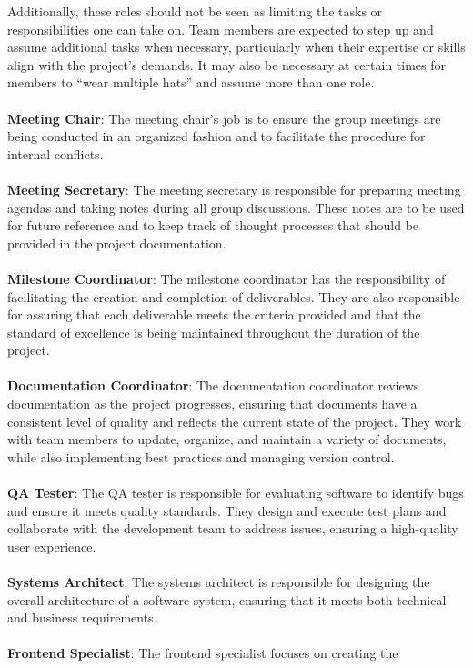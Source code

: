 \documentclass{article}
\begin{document}
Additionally, these roles should not be seen as limiting the tasks or
responsibilities one can take on. Team members are expected to step up and
assume additional tasks when necessary, particularly when their expertise or
skills align with the project’s demands. It may also be necessary at certain
times for members to “wear multiple hats” and assume more than one role. \\
\\
\textbf{Meeting Chair}: The meeting chair’s job is to ensure the group meetings
are being conducted in an organized fashion and to facilitate the procedure for
internal conflicts. \\
\\
\textbf{Meeting Secretary}: The meeting secretary is responsible for preparing
meeting agendas and taking notes during all group discussions. These notes are
to be used for future reference and to keep track of thought processes that
should be provided in the project documentation. \\
\\
\textbf{Milestone Coordinator}: The milestone coordinator has the responsibility
of facilitating the creation and completion of deliverables. They are also
responsible for assuring that each deliverable meets the criteria provided and
that the standard of excellence is being maintained throughout the duration of
the project. \\
\\
\textbf{Documentation Coordinator}: The documentation coordinator reviews
documentation as the project progresses, ensuring that documents have a
consistent level of quality and reflects the current state of the project. They
work with team members to update, organize, and maintain a variety of documents,
while also implementing best practices and managing version control. \\
\\
\textbf{QA Tester}: The QA tester is responsible for evaluating software to
identify bugs and ensure it meets quality standards. They design and execute
test plans and collaborate with the development team to address issues, ensuring
a high-quality user experience. \\
\\
\textbf{Systems Architect}: The systems architect is responsible for designing
the overall architecture of a software system, ensuring that it meets both
technical and business requirements. \\
\\
\textbf{Frontend Specialist}: The frontend specialist focuses on creating the
\end{document}

